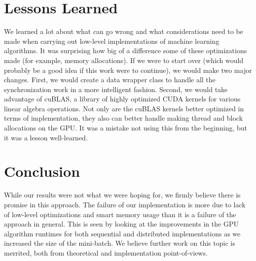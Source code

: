 \documentclass{article}
\begin{document}
\section{Lessons Learned}
We learned a lot about what can go wrong and what considerations need to be
made when carrying out low-level implementations of machine learning
algorithms. It was surprising how big of a difference some of these
optimizations made (for example, memory allocations). If we were to start over
(which would probably be a good idea if this work were to continue), we would
make two major changes. First, we would create a data wrapper class to handle
all the synchronization work in a more intelligent fashion. Second, we would
take advantage of cuBLAS, a library of highly optimized CUDA kernels for
various linear algebra operations. Not only are the cuBLAS kernels better
optimized in terms of implementation, they also can better handle making thread
and block allocations on the GPU. It was a mistake not using this from the
beginning, but it was a lesson well-learned.

\section{Conclusion}
While our results were not what we were hoping for, we firmly believe there is
promise in this approach. The failure of our implementation is more due to lack
of low-level optimizations and smart memory usage than it is a failure of the
approach in general. This is seen by looking at the improvements in the GPU
algorithm runtimes for both sequential and distributed implementations as we
increased the size of the mini-batch. We believe further work on this topic is
merrited, both from theoretical and implementation point-of-views.

%
%
\end{document}
